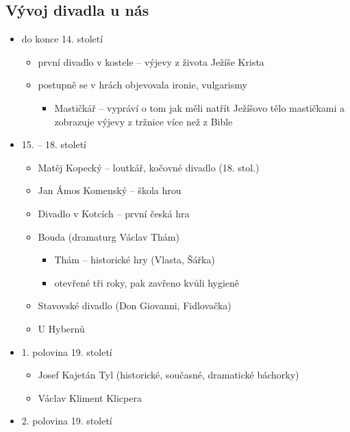 \subsection{Vývoj divadla u nás}
\begin{itemize}
\item do konce 14. století
	\begin{itemize}
	\item první divadlo v kostele -- výjevy z života Ježíše Krista
	\item postupně se v hrách objevovala ironie, vulgarismy
		\begin{itemize}
		\item Mastičkář -- vypráví o tom jak měli natřít Ježíšovo tělo mastičkami a zobrazuje výjevy z tržnice více než z Bible
		\end{itemize}
	\end{itemize}
\item 15. -- 18. století
	\begin{itemize}
	\item Matěj Kopecký -- loutkář, kočovné divadlo (18. stol.)
	\item Jan Ámos Komenský -- škola hrou
	\item Divadlo v Kotcích -- první česká hra
	\item Bouda (dramaturg Václav Thám)
		\begin{itemize}
		\item Thám -- historické hry (Vlasta, Šářka)
		\item otevřené tři roky, pak zavřeno kvůli hygieně
		\end{itemize}
	\item Stavovské divadlo (Don Giovanni, Fidlovačka)
	\item U Hybernů
	\end{itemize}
\item 1. polovina 19. století
	\begin{itemize}
	\item Josef Kajetán Tyl (historické, současné, dramatické báchorky)
	\item Václav Kliment Klicpera
	\end{itemize}
\item 2. polovina 19. století
\end{itemize}

